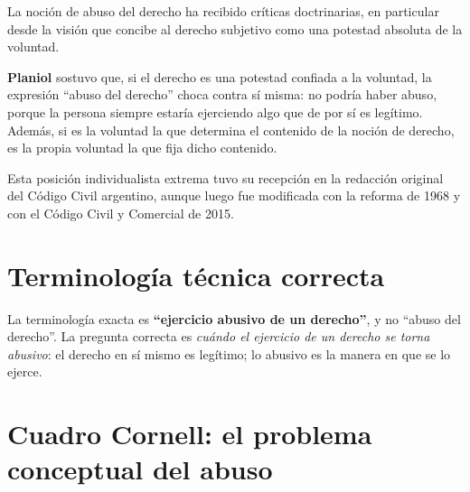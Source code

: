 \documentclass[12pt,oneside]{book}
\begin{document}
La noción de abuso del derecho ha recibido críticas doctrinarias, en particular desde la visión que concibe al derecho subjetivo como una potestad absoluta de la voluntad.

\textbf{Planiol} sostuvo que, si el derecho es una potestad confiada a la voluntad, la expresión ``abuso del derecho'' choca contra sí misma: no podría haber abuso, porque la persona siempre estaría ejerciendo algo que de por sí es legítimo. Además, si es la voluntad la que determina el contenido de la noción de derecho, es la propia voluntad la que fija dicho contenido.

Esta posición individualista extrema tuvo su recepción en la redacción original del Código Civil argentino, aunque luego fue modificada con la reforma de 1968 y con el Código Civil y Comercial de 2015.

\section{Terminología técnica correcta}

\begin{important}
La terminología exacta es \textbf{``ejercicio abusivo de un derecho''}, y no ``abuso del derecho''. La pregunta correcta es \emph{cuándo el ejercicio de un derecho se torna abusivo}: el derecho en sí mismo es legítimo; lo abusivo es la manera en que se lo ejerce.
\end{important}

\section{Cuadro Cornell: el problema conceptual del abuso}
\end{document}
